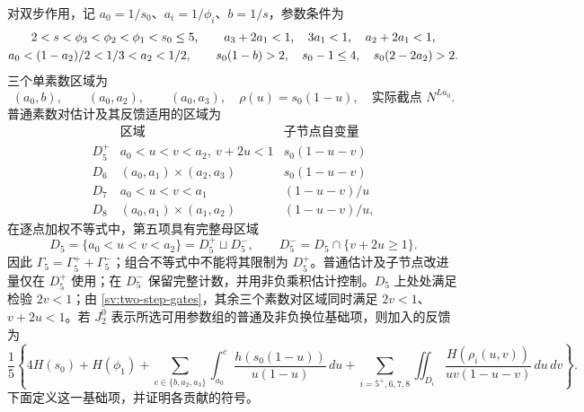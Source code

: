 对双步作用，记 $a_0=1/s_0$、$a_i=1/\phi_i$、$b=1/s$，参数条件为
\begin{gather}\label{sv:two-step-gates}
 2<s<\phi_3<\phi_2<\phi_1<s_0\le5,\qquad
 a_3+2a_1<1,\quad3a_1<1,\quad a_2+2a_1<1,\notag\\
 a_0<(1-a_2)/2<1/3<a_2<1/2,\qquad
 s_0(1-b)>2,\quad s_0-1\le4,\quad s_0(2-2a_2)>2.
\end{gather}
三个单素数区域为
\begin{equation}\label{sv:singleton-domains}
 (a_0,b),\qquad(a_0,a_2),\qquad(a_0,a_3),
 \quad \rho(u)=s_0(1-u),
 \quad\text{实际截点 }N^{La_0}.
\end{equation}
普通素数对估计及其反馈适用的区域为
\[
\begin{array}{c|c|c}
 &\text{区域}&\text{子节点自变量}\\ \hline
 D_5^+&a_0<u<v<a_2,\ v+2u<1&s_0(1-u-v)\\
 D_6&(a_0,a_1)\times(a_2,a_3)&s_0(1-u-v)\\
 D_7&a_0<u<v<a_1&(1-u-v)/u\\
 D_8&(a_0,a_1)\times(a_1,a_2)&(1-u-v)/u,
\end{array}
\]
在逐点加权不等式中，第五项具有完整母区域
\begin{equation}\label{sv:complete-fifth-region}
 D_5=\{a_0<u<v<a_2\}
     =D_5^+\sqcup D_5^-,\qquad
 D_5^-=D_5\cap\{v+2u\ge1\}.
\end{equation}
因此 $\Gamma_5=\Gamma_5^++\Gamma_5^-$；组合不等式中不能将其限制为 $D_5^+$。普通估计及子节点改进量仅在 $D_5^+$ 使用；在 $D_5^-$ 保留完整计数，并用非负乘积估计控制。$D_5$ 上处处满足检验 $2v<1$；由 \eqref{sv:two-step-gates}，其余三个素数对区域同时满足 $2v<1$、$v+2u<1$。若 $J_2^0$ 表示所选可用参数组的普通及非负换位基础项，则加入的反馈为
\begin{equation}\label{sv:two-step-feedback}
 \frac15\left\{4H(s_0)+H(\phi_1)
 +\sum_{c\in\{b,a_2,a_3\}}\int_{a_0}^{c}
       \frac{h(s_0(1-u))}{u(1-u)}\,du
 +\sum_{i=5^+,6,7,8}\iint_{D_i}
       \frac{H(\rho_i(u,v))}{uv(1-u-v)}\,du\,dv\right\}.
\end{equation}
下面定义这一基础项，并证明各贡献的符号。

